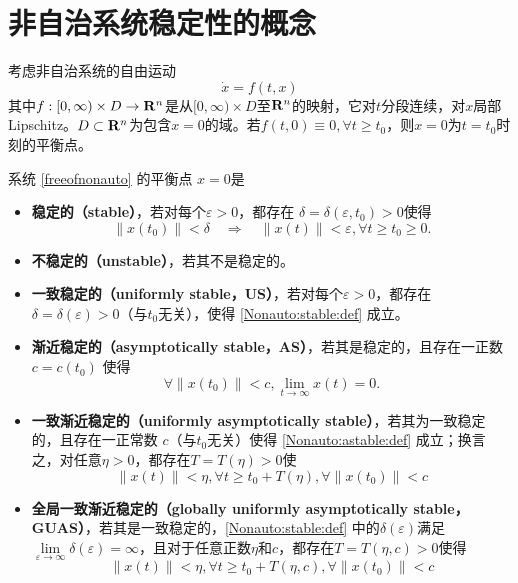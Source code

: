 \section{非自治系统稳定性的概念}\label{3Bref}
考虑非自治系统的自由运动
\begin{equation}\label{freeofnonauto}
  \dot{x}=f(t,x)
\end{equation}
其中$f : [0, \infty) \times D \rightarrow \mathbf{R}{}^n$是从$[0, \infty) \times D$至$\mathbf{R}{}^n$的映射，它对$t$分段连续，对$x$局部Lipschitz。$D\subset\mathbf{R}{}^n$为包含$x=0$的域。若$f(t,0)\equiv0,\forall t\ge t_0$，则$x=0$为$t=t_0$时刻的平衡点。
\begin{definition}[非自治系统的稳定性]
 系统 \eqref{freeofnonauto} 的平衡点 $x = 0$是
  \begin{itemize}[leftmargin=1em]
    \item {\bf 稳定的（stable）}，若对每个$\varepsilon > 0$，都存在 $\delta =    \delta (\varepsilon, t_0)>0$使得
    \begin{equation}
      \| x (t_0) \| < \delta \quad \Rightarrow \quad \| x (t) \| <
      \varepsilon, \forall t \geq t_0 \geq 0 \label{Nonauto:stable:def} .
    \end{equation}
    \item {\bf 不稳定的（unstable）}，若其不是稳定的。
    
    \item {\bf 一致稳定的（uniformly stable，US）}，若对每个$\varepsilon > 0$，都存在
    $\delta = \delta (\varepsilon) > 0$（与$t_0$无关），使得 \eqref{Nonauto:stable:def} 成立。
    
    \item {\bf 渐近稳定的（asymptotically stable，AS）}，若其是稳定的，且存在一正数
     $c = c (t_0)$ 使得
    \begin{equation}
      \forall \| x (t_0) \| < c, \lim_{t \rightarrow \infty} x (t) = 0 \label{Nonauto:astable:def} .
    \end{equation}
    \item {\bf 一致渐近稳定的（uniformly asymptotically stable）}，若其为一致稳定的，且存在一正常数 $c$（与$t_0$无关）使得 \eqref{Nonauto:astable:def} 成立；换言之，对任意$\eta>0$，都存在$T=T(\eta)>0$使
    \[\|x(t)\|<\eta,\forall t\ge t_0+T(\eta),\forall\|x(t_0)\|<c\]
    
    \item {\bf 全局一致渐近稳定的（globally uniformly asymptotically stable，GUAS）}，若其是一致稳定的，\eqref{Nonauto:stable:def} 中的$\delta(\varepsilon)$满足$\lim\limits_{\varepsilon\to\infty}\delta(\varepsilon)=\infty$，且对于任意正数$\eta$和$c$，都存在$T=T(\eta,c)>0$使得
    \[\|x(t)\|<\eta,\forall t\ge t_0+T(\eta,c),\forall\|x(t_0)\|<c\]
  \end{itemize}
\end{definition}
